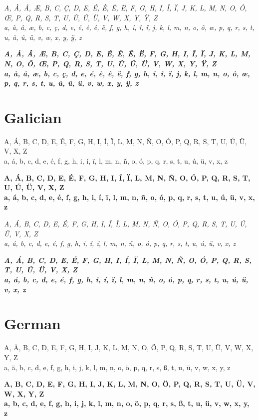 \documentclass[12pt]{article}
\begin{document}
\textit{
A, À, Â, Æ, B, C, Ç, D, E, É, È, Ê, Ë, F, G, H, I, Î, Ï, J, K, L, M, N, O, Ô, Œ, P, Q, R, S, T, U, Ù, Û, Ü, V, W, X, Y, Ÿ, Z \\
a, à, â, æ, b, c, ç, d, e, é, è, ê, ë, f, g, h, i, î, ï, j, k, l, m, n, o, ô, œ, p, q, r, s, t, u, ù, û, ü, v, w, x, y, ÿ, z
}


\textit{\textbf{
A, À, Â, Æ, B, C, Ç, D, E, É, È, Ê, Ë, F, G, H, I, Î, Ï, J, K, L, M, N, O, Ô, Œ, P, Q, R, S, T, U, Ù, Û, Ü, V, W, X, Y, Ÿ, Z \\
a, à, â, æ, b, c, ç, d, e, é, è, ê, ë, f, g, h, i, î, ï, j, k, l, m, n, o, ô, œ, p, q, r, s, t, u, ù, û, ü, v, w, x, y, ÿ, z
}}


\section{Galician}
A, Á, B, C, D, E, É, F, G, H, I, Í, Ï, L, M, N, Ñ, O, Ó, P, Q, R, S, T, U, Ú, Ü, V, X, Z\\
a, á, b, c, d, e, é, f, g, h, i, í, ï, l, m, n, ñ, o, ó, p, q, r, s, t, u, ú, ü, v, x, z

\textbf{
A, Á, B, C, D, E, É, F, G, H, I, Í, Ï, L, M, N, Ñ, O, Ó, P, Q, R, S, T, U, Ú, Ü, V, X, Z\\
a, á, b, c, d, e, é, f, g, h, i, í, ï, l, m, n, ñ, o, ó, p, q, r, s, t, u, ú, ü, v, x, z
}

\textit{
A, Á, B, C, D, E, É, F, G, H, I, Í, Ï, L, M, N, Ñ, O, Ó, P, Q, R, S, T, U, Ú, Ü, V, X, Z\\
a, á, b, c, d, e, é, f, g, h, i, í, ï, l, m, n, ñ, o, ó, p, q, r, s, t, u, ú, ü, v, x, z
}

\textbf{\textit{
A, Á, B, C, D, E, É, F, G, H, I, Í, Ï, L, M, N, Ñ, O, Ó, P, Q, R, S, T, U, Ú, Ü, V, X, Z\\
a, á, b, c, d, e, é, f, g, h, i, í, ï, l, m, n, ñ, o, ó, p, q, r, s, t, u, ú, ü, v, x, z
}}


\clearpage
\section{German}
A, Ä, B, C, D, E, F, G, H, I, J, K, L, M, N, O, Ö, P, Q, R, S, T, U, Ü, V, W, X, Y, Z \\
a, ä, b, c, d, e, f, g, h, i, j, k, l, m, n, o, ö, p, q, r, s, ß, t, u, ü, v, w, x, y, z

\textbf{
A, B, C, D, E, F, G, H, I, J, K, L, M, N, O, Ö, P, Q, R, S, T, U, Ü, V, W, X, Y, Z \\
a, b, c, d, e, f, g, h, i, j, k, l, m, n, o, ö, p, q, r, s, ß, t, u, ü, v, w, x, y, z
}
\end{document}
